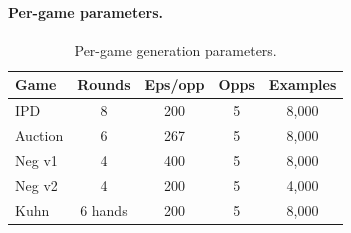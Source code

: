 \documentclass[letterpaper]{article} %
\begin{document}
\paragraph{Per-game parameters.}
\begin{table}[h]
\centering
\small
\setlength{\tabcolsep}{4pt}
\begin{tabular}{@{}lcccc@{}}
\toprule
\textbf{Game} & \textbf{Rounds} & \textbf{Eps/opp} & \textbf{Opps} & \textbf{Examples} \\
\midrule
IPD         & 8       & 200 & 5 & 8{,}000 \\
Auction     & 6       & 267 & 5 & 8{,}000 \\
Neg v1      & 4       & 400 & 5 & 8{,}000 \\
Neg v2      & 4       & 200 & 5 & 4{,}000 \\
Kuhn        & 6 hands & 200 & 5 & 8{,}000 \\
\bottomrule
\end{tabular}
\caption{Per-game generation parameters.}
\label{tab:gen-params}
\end{table}
\end{document}
